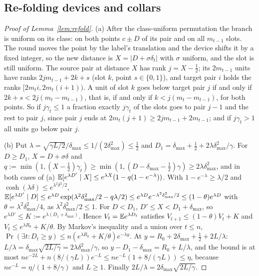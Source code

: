 \subsection{Re-folding devices and collars}

\begin{proof}[Proof of Lemma~\ref{lem:refold}]
(a) After the class-uniform permutation the branch is uniform on its class: on both points $c\pm D$ of its pair and on all $m_{t-1}$ slots. The round moves the point by the
label's translation and the device shifts it by a fixed integer, so the new distance is $X=|D+\sigma\delta_t|$ with $\sigma$ uniform, and the slot is still uniform. The
source pair at distance $X$ has rank $j=X-\frac12$; its $2m_{t-1}$ units have ranks $2jm_{t-1}+2k+s$ (slot $k$, point $s\in\{0,1\}$), and target pair $i$ holds the ranks
$[2m_ti,2m_t(i+1))$. A unit of slot $k$ goes below target pair $j$ if and only if $2k+s<2j(m_t-m_{t-1})$, that is, if and only if $k<j(m_t-m_{t-1})$, for both points. So
if $j\gamma_t\le1$ a fraction exactly $j\gamma_t$ of the slots goes to pair $j-1$ and the rest to pair $j$, since pair $j$ ends at $2m_t(j+1)\ge2jm_{t-1}+2m_{t-1}$; and if
$j\gamma_t>1$ all units go below pair $j$.

(b) Put $\lambda=\sqrt{\gamma L/2}/\delta_{\max}\le1/(2\delta_{\max}^2)\le\frac12$ and $D_1=\delta_{\max}+\frac12+2\lambda\delta_{\max}^2/\gamma$. For $D\ge D_1$, $X=D+\sigma\delta$ and
$q:=\min(1,(X-\frac12)\gamma_t)\ge\min(1,(D-\delta_{\max}-\frac12)\gamma)\ge2\lambda\delta_{\max}^2$, and in both cases of (a) $\mathbb E[e^{\lambda D'}\mid X]\le e^{\lambda X}(1-q(1-e^{-\lambda}))$. With
$1-e^{-\lambda}\ge\lambda/2$ and $\cosh(\lambda\delta)\le e^{\lambda^2\delta^2/2}$, $\mathbb E[e^{\lambda D'}\mid D]\le e^{\lambda D}\exp(\lambda^2\delta_{\max}^2/2-q\lambda/2)\le e^{\lambda D}e^{-\lambda^2\delta_{\max}^2/2}
\le(1-\theta)e^{\lambda D}$ with $\theta=\lambda^2\delta_{\max}^2/4$, as $\lambda^2\delta_{\max}^2/2\le1$. For $D<D_1$, $D'\le X<D_1+\delta_{\max}$, so $e^{\lambda D'}\le K:=e^{\lambda(D_1+\delta_{\max})}$.
Hence $V_t=\mathbb E e^{\lambda D_t}$ satisfies $V_{t+1}\le(1-\theta)V_t+K$ and $V_t\le e^{\lambda R_0}+K/\theta$. By Markov's inequality and a union over $t\le n$,
$\Pr(\exists t:D_t\ge y)\le n(e^{\lambda R_0}+K/\theta)e^{-\lambda y}$. At $y=R_0+2\delta_{\max}+\frac12+2L/\lambda$: $L/\lambda=\delta_{\max}\sqrt{2L/\gamma}=2\lambda\delta_{\max}^2/\gamma$, so
$y-D_1-\delta_{\max}=R_0+L/\lambda$, and the bound is at most $ne^{-2L}+n(8/(\gamma L))e^{-L}\le ne^{-L}(1+8/(\gamma L))\le\eta$, because $ne^{-L}=\eta/(1+8/\gamma)$ and
$L\ge1$. Finally $2L/\lambda=2\delta_{\max}\sqrt{2L/\gamma}$.
\end{proof}

